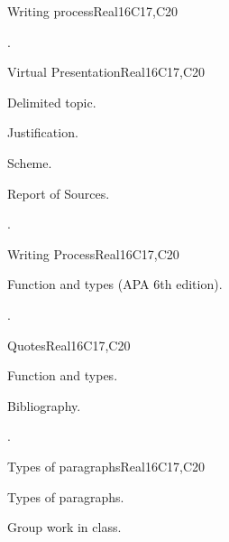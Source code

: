 \begin{syllabus}
\begin{unit}{Writing process}{}{Real}{16}{C17,C20}
  \begin{learningoutcomes}
   \item .%
  \end{learningoutcomes}
\end{unit}

\begin{unit}{Virtual Presentation}{}{Real}{16}{C17,C20}
  \begin{topics}
      \item Delimited topic.
      \item Justification.
      \item Scheme.
      \item Report of Sources.
  \end{topics}

  \begin{learningoutcomes}
   \item .%
  \end{learningoutcomes}
\end{unit}

\begin{unit}{Writing Process}{}{Real}{16}{C17,C20}
  \begin{topics}
      \item Function and types (APA 6th edition).
  \end{topics}

  \begin{learningoutcomes}
   \item .%
  \end{learningoutcomes}
\end{unit}

\begin{unit}{Quotes}{}{Real}{16}{C17,C20}
  \begin{topics}
      \item Function and types.
      \item Bibliography.
  \end{topics}

  \begin{learningoutcomes}
   \item .%
  \end{learningoutcomes}
\end{unit}

\begin{unit}{Types of paragraphs}{}{Real}{16}{C17,C20}
  \begin{topics}
      \item Types of paragraphs.
      \item Group work in class.
  \end{topics}


\end{unit}
\end{syllabus}
